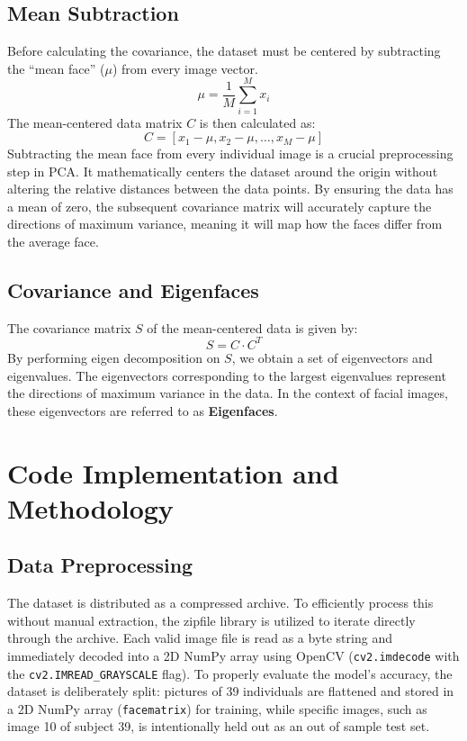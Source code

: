 \documentclass[12pt]{article}
\begin{document}
\subsection{Mean Subtraction}
Before calculating the covariance, the dataset must be centered by subtracting the ``mean face'' ($\mu$) from every image vector.
\begin{equation}
    \mu = \frac{1}{M} \sum_{i=1}^{M} x_i
\end{equation}
The mean-centered data matrix $C$ is then calculated as:
\begin{equation}
    C = [x_1 - \mu, x_2 - \mu, \dots, x_M - \mu]
\end{equation}
Subtracting the mean face from every individual image is a crucial preprocessing step in PCA. It mathematically centers the dataset around the origin without altering the relative distances between the data points. By ensuring the data has a mean of zero, the subsequent covariance matrix will accurately capture the directions of maximum variance, meaning it will map how the faces differ from the average face.

\subsection{Covariance and Eigenfaces}
The covariance matrix $S$ of the mean-centered data is given by:
\begin{equation}
    S = C \cdot C^T
\end{equation}
By performing eigen decomposition on $S$, we obtain a set of eigenvectors and eigenvalues. The eigenvectors corresponding to the largest eigenvalues represent the directions of maximum variance in the data. In the context of facial images, these eigenvectors are referred to as \textbf{Eigenfaces}.

\section{Code Implementation and Methodology}
\subsection{Data Preprocessing}
The dataset is distributed as a compressed archive. To efficiently process this without manual extraction, the zipfile library is utilized to iterate directly through the archive. Each valid image file is read as a byte string and immediately decoded into a 2D NumPy array using OpenCV (\texttt{cv2.imdecode} with the \texttt{cv2.IMREAD\_GRAYSCALE} flag). To properly evaluate the model's accuracy, the dataset is deliberately split: pictures of 39 individuals are flattened and stored in a 2D NumPy array (\texttt{facematrix}) for training, while specific images, such as image 10 of subject 39, is intentionally held out as an out of sample test set.
\end{document}
